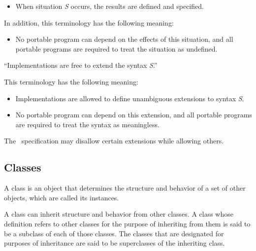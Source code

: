 \begin{flushdesc}
\begin{itemize}
\item  When situation {\it S} occurs, the results are defined and
specified.

\end{itemize}

\noindent
In addition, this terminology has the following meaning:

\begin{itemize}

\item  No portable program can depend on the effects of this
situation, and all portable programs are required to treat the situation
as undefined.

\end{itemize}

\item[``Implementations are free to extend the syntax {\it S}.'']

This terminology has the following meaning:

\begin{itemize}

\item  Implementations are allowed to define unambiguous extensions
to syntax {\it S}.

\item  No portable program can depend on this extension, and
all portable programs are required to treat the syntax
as meaningless.

\end{itemize}
\end{flushdesc}

The \CLOS\ specification may disallow certain extensions while allowing others.


\subsection{Classes}
\label{Classes-SECTION}

A {\bit class\/} is an object that determines the structure and behavior 
of a set of other objects, which are called its {\bit instances}.   

A class can inherit structure and behavior from other classes.  
A class whose definition refers to other classes for the purpose of
inheriting from them is said to be a {\bit subclass\/} of each of
those classes.  The classes that are designated for purposes of
inheritance are said to be {\bit superclasses\/}
of the inheriting class.


